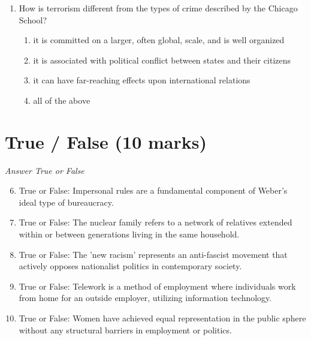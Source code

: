 \documentclass[12pt]{article}
\begin{document}
\begin{enumerate}[label=\arabic*.]
\begin{enumerate}[label=(\alph*)]
    \item decreased rates of prostitution and sex tourism
    \item developing countries can depend on it as a crucial source of income
    \item the exploitation of cheap, unregulated labour in poor countries
    \item we have become more aware of 'other' societies and ways of living
\end{enumerate}
\item How is terrorism different from the types of crime described by the Chicago School?
\begin{enumerate}[label=(\alph*)]
    \item it is committed on a larger, often global, scale, and is well organized
    \item it is associated with political conflict between states and their citizens
    \item it can have far-reaching effects upon international relations
    \item all of the above
\end{enumerate}
\end{enumerate}

\section*{True / False (10 marks)}
\textit{Answer True or False}
\begin{enumerate}[label=\arabic*.]
\setcounter{enumi}{5}
\item True or False: Impersonal rules are a fundamental component of Weber's ideal type of bureaucracy.
\item True or False: The nuclear family refers to a network of relatives extended within or between generations living in the same household.
\item True or False: The 'new racism' represents an anti-fascist movement that actively opposes nationalist politics in contemporary society.
\item True or False: Telework is a method of employment where individuals work from home for an outside employer, utilizing information technology.
\item True or False: Women have achieved equal representation in the public sphere without any structural barriers in employment or politics.
\end{enumerate}
\end{document}
